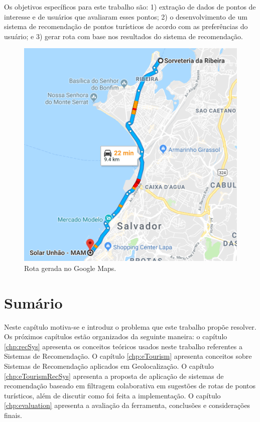 Os objetivos específicos para este trabalho são: 1) extração de dados de pontos de interesse e de usuários que avaliaram esses pontos; 2) o desenvolvimento de um sistema de recomendação de pontos turísticos de acordo com as preferências do usuário; e 3) gerar rota com base nos resultados do sistema de recomendação.

\begin{figure}[h!]
	\centering
	\includegraphics[scale=0.63]{images/image_2018-04-06_01-20-19.png}
	\caption{Rota gerada no Google Maps.}
	\label{fig:route_default}
\end{figure}

\section{Sumário}
\label{sec:summaryIntroduction}

Neste capítulo motiva-se e introduz o problema que este trabalho propõe resolver. Os próximos capítulos estão organizados da seguinte maneira: o capítulo \ref{chp:recSys} apresenta os conceitos teóricos usados neste trabalho referentes a Sistemas de Recomendação. O capítulo \ref{chp:eTourism} apresenta conceitos sobre Sistemas de Recomendação aplicados em Geolocalização. O capítulo \ref{chp:eTourismRecSys} apresenta a proposta de aplicação de sistemas de recomendação baseado em filtragem colaborativa em sugestões de rotas de pontos turísticos, além de discutir como foi feita a implementação. O capítulo \ref{chp:evaluation} apresenta a avaliação da ferramenta, conclusões e considerações finais.